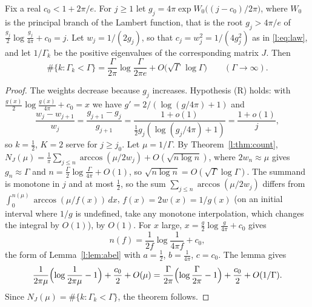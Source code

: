\begin{theorem}\label{l:thm:law}
Fix a real $c_0<1+2\pi/e$. For $j\ge1$ let $g_j=4\pi\exp W_0\bigl((j-c_0)/2\pi\bigr)$, where $W_0$ is the principal branch of the Lambert function, that is the root $g_j>4\pi/e$ of $\frac{g_j}2\log\frac{g_j}{4\pi}+c_0=j$. Let $w_j=1/(2g_j)$, so that $c_j=w_j^2=1/(4g_j^2)$ as in \eqref{l:eq:law}, and let $1/\Gamma_k$ be the positive eigenvalues of the corresponding matrix $J$. Then
\[
\#\{k:\Gamma_k<\Gamma\}=\frac\Gamma{2\pi}\log\frac\Gamma{2\pi e}+O\bigl(\sqrt\Gamma\,\log\Gamma\bigr)\qquad(\Gamma\to\infty).
\]
\end{theorem}

\begin{proof}
The weights decrease because $g_j$ increases. Hypothesis (R) holds: with $\frac{g(x)}2\log\frac{g(x)}{4\pi}+c_0=x$ we have $g'=2/(\log(g/4\pi)+1)$ and
\[
\frac{w_j-w_{j+1}}{w_j}=\frac{g_{j+1}-g_j}{g_{j+1}}=\frac{1+o(1)}{\frac12g_j(\log(g_j/4\pi)+1)}=\frac{1+o(1)}j,
\]
so $k=\frac12$, $K=2$ serve for $j\ge j_0$. Let $\mu=1/\Gamma$. By Theorem~\ref{l:thm:count}, $N_J(\mu)=\frac1\pi\sum_{j\le n}\arccos(\mu/2w_j)+O(\sqrt{n\log n})$, where $2w_n\approx\mu$ gives $g_n\approx\Gamma$ and $n=\frac\Gamma2\log\frac\Gamma{4\pi}+O(1)$, so $\sqrt{n\log n}=O(\sqrt\Gamma\log\Gamma)$. The summand is monotone in $j$ and at most $\frac12$, so the sum $\sum_{j\le n}\arccos(\mu/2w_j)$ differs from $\int_0^{n(\mu)}\arccos(\mu/f(x))\,dx$, $f(x)=2w(x)=1/g(x)$ (on an initial interval where $1/g$ is undefined, take any monotone interpolation, which changes the integral by $O(1)$), by $O(1)$. For $x$ large, $x=\frac{g}2\log\frac g{4\pi}+c_0$ gives
\[
n(f)=\frac1{2f}\log\frac1{4\pi f}+c_0 ,
\]
the form of Lemma~\ref{l:lem:abel} with $a=\frac12$, $b=\frac1{4\pi}$, $c=c_0$. The lemma gives
\[
\frac1{2\pi\mu}\Bigl(\log\frac1{2\pi\mu}-1\Bigr)+\frac{c_0}2+O(\mu)=\frac\Gamma{2\pi}\Bigl(\log\frac\Gamma{2\pi}-1\Bigr)+\frac{c_0}2+O(1/\Gamma).
\]
Since $N_J(\mu)=\#\{k:\Gamma_k<\Gamma\}$, the theorem follows.
\end{proof}

